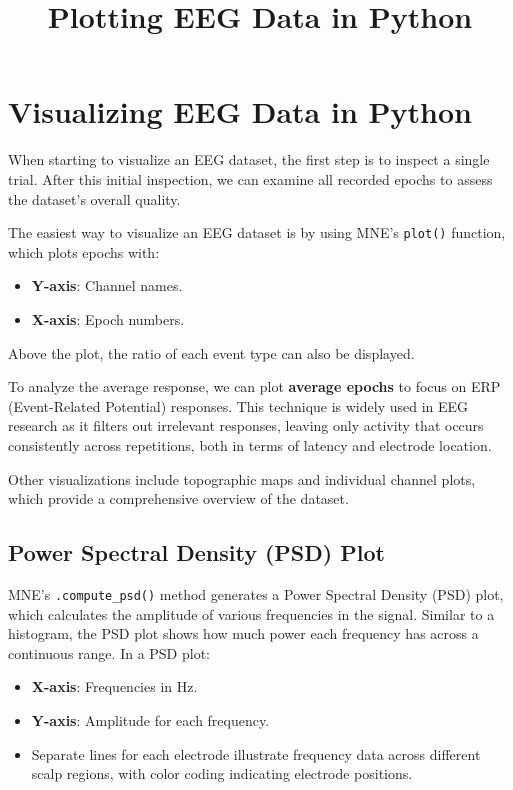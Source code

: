 \documentclass{article}
\title{Plotting EEG Data in Python}
\author{}
\date{}
\begin{document}
\maketitle

\section{Visualizing EEG Data in Python}
When starting to visualize an EEG dataset, the first step is to inspect a single trial. After this initial inspection, we can examine all recorded epochs to assess the dataset’s overall quality. 

The easiest way to visualize an EEG dataset is by using MNE's \texttt{plot()} function, which plots epochs with:
\begin{itemize}
    \item \textbf{Y-axis}: Channel names.
    \item \textbf{X-axis}: Epoch numbers.
\end{itemize}
Above the plot, the ratio of each event type can also be displayed.

To analyze the average response, we can plot \textbf{average epochs} to focus on ERP (Event-Related Potential) responses. This technique is widely used in EEG research as it filters out irrelevant responses, leaving only activity that occurs consistently across repetitions, both in terms of latency and electrode location.

Other visualizations include topographic maps and individual channel plots, which provide a comprehensive overview of the dataset.

\subsection{Power Spectral Density (PSD) Plot}
MNE's \texttt{.compute\_psd()} method generates a Power Spectral Density (PSD) plot, which calculates the amplitude of various frequencies in the signal. Similar to a histogram, the PSD plot shows how much power each frequency has across a continuous range. In a PSD plot:
\begin{itemize}
    \item \textbf{X-axis}: Frequencies in Hz.
    \item \textbf{Y-axis}: Amplitude for each frequency.
    \item Separate lines for each electrode illustrate frequency data across different scalp regions, with color coding indicating electrode positions.
\end{itemize}
\end{document}
